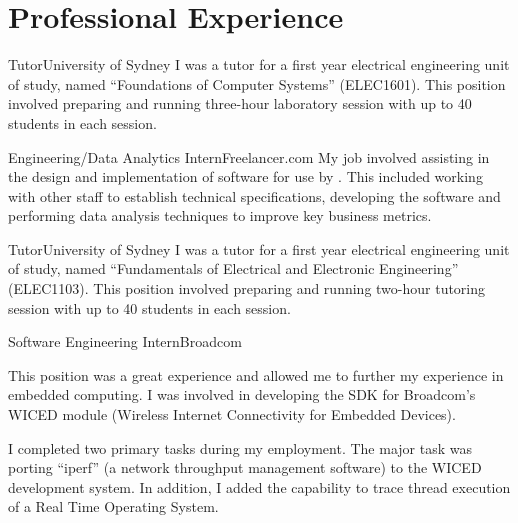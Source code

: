 \documentclass[10pt]{article}
\begin{document}
\section*{Professional Experience}
\begin{professionalExperience}

{Tutor}{University of Sydney}
{I was a tutor for a first year electrical engineering unit of study, named 
``Foundations of Computer Systems'' (ELEC1601). This position involved preparing
and running three-hour laboratory session with up to 40 students in each 
session.}
{}

{Engineering/Data Analytics Intern}{Freelancer.com}
{My job involved assisting in the design and implementation of software for use
by . This included working with other staff to establish
technical specifications, developing the software and performing data analysis 
techniques to improve key business metrics.}
{
}

{Tutor}{University of Sydney}
{I was a tutor for a first year electrical engineering unit of study, named 
``Fundamentals of Electrical and Electronic Engineering'' (ELEC1103). This 
position involved preparing and running two-hour tutoring session with up to 40 
students in each session.}
{}

{Software Engineering Intern}{Broadcom}
{This position was a great experience and allowed me to further my experience in
embedded computing. I was involved in developing the SDK for Broadcom's WICED 
module (Wireless Internet Connectivity for Embedded Devices).

I completed two primary tasks during my employment. The major task was porting 
``iperf'' (a network throughput management software) to the WICED development 
system. In addition, I added the capability to trace thread execution of a Real 
Time Operating System.}
{
}


\end{professionalExperience}
\end{document}
